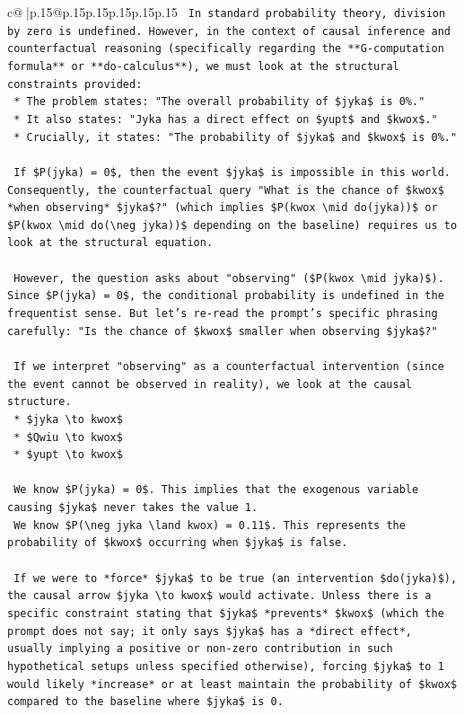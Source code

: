 \documentclass{article}
\begin{document}
{\begin{supertabular}{c@{$\;$}|p{.15\linewidth}@{}p{.15\linewidth}p{.15\linewidth}p{.15\linewidth}p{.15\linewidth}p{.15\linewidth}}
{{{\texttt{    In standard probability theory, division by zero is undefined. However, in the context of causal inference and counterfactual reasoning (specifically regarding the **G{-}computation formula** or **do{-}calculus**), we must look at the structural constraints provided:} \\
\texttt{    *   The problem states: "The overall probability of \$jyka\$ is 0\%."} \\
\texttt{    *   It also states: "Jyka has a direct effect on \$yupt\$ and \$kwox\$."} \\
\texttt{    *   Crucially, it states: "The probability of \$jyka\$ and \$kwox\$ is 0\%."} \\
\\ 
\texttt{    If \$P(jyka) = 0\$, then the event \$jyka\$ is impossible in this world. Consequently, the counterfactual query "What is the chance of \$kwox\$ *when observing* \$jyka\$?" (which implies \$P(kwox \textbackslash{}mid do(jyka))\$ or \$P(kwox \textbackslash{}mid do(\textbackslash{}neg jyka))\$ depending on the baseline) requires us to look at the structural equation.} \\
\\ 
\texttt{    However, the question asks about "observing" (\$P(kwox \textbackslash{}mid jyka)\$). Since \$P(jyka) = 0\$, the conditional probability is undefined in the frequentist sense. But let's re{-}read the prompt's specific phrasing carefully: "Is the chance of \$kwox\$ smaller when observing \$jyka\$?"} \\
\\ 
\texttt{    If we interpret "observing" as a counterfactual intervention (since the event cannot be observed in reality), we look at the causal structure.} \\
\texttt{    *   \$jyka \textbackslash{}to kwox\$} \\
\texttt{    *   \$Qwiu \textbackslash{}to kwox\$} \\
\texttt{    *   \$yupt \textbackslash{}to kwox\$} \\
\\ 
\texttt{    We know \$P(jyka) = 0\$. This implies that the exogenous variable causing \$jyka\$ never takes the value 1.} \\
\texttt{    We know \$P(\textbackslash{}neg jyka \textbackslash{}land kwox) = 0.11\$. This represents the probability of \$kwox\$ occurring when \$jyka\$ is false.} \\
\\ 
\texttt{    If we were to *force* \$jyka\$ to be true (an intervention \$do(jyka)\$), the causal arrow \$jyka \textbackslash{}to kwox\$ would activate. Unless there is a specific constraint stating that \$jyka\$ *prevents* \$kwox\$ (which the prompt does not say; it only says \$jyka\$ has a *direct effect*, usually implying a positive or non{-}zero contribution in such hypothetical setups unless specified otherwise), forcing \$jyka\$ to 1 would likely *increase* or at least maintain the probability of \$kwox\$ compared to the baseline where \$jyka\$ is 0.} \\
}}}
\end{supertabular}}
\end{document}
